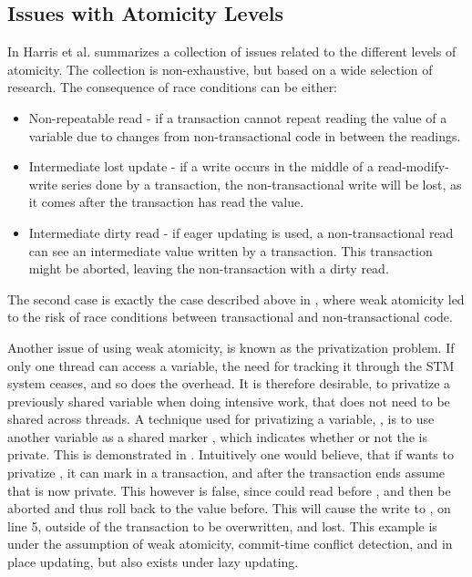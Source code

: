\subsection{Issues with Atomicity Levels}
In \cite[p. 30-35]{harris2010transactional} Harris et al. summarizes a collection of issues related to the different levels of atomicity. The collection is non-exhaustive, but based on a wide selection of research. The consequence of race conditions can be either:
\begin{itemize}
	\item Non-repeatable read - if a transaction cannot repeat reading the value of a variable due to changes from non-transactional code in between the readings.
	\item Intermediate lost update - if a write occurs in the middle of a read-modify-write series done by a transaction, the non-transactional write will be lost, as it comes after the transaction has read the value.
	\item Intermediate dirty read - if eager updating\cite[p. 53]{dpt907e14trending} is used, a non-transactional read can see an intermediate value written by a transaction. This transaction might be aborted, leaving the non-transaction with a dirty read.
\end{itemize}
The second case is exactly the case described above in , where weak atomicity led to the risk of race conditions between transactional and non-transactional code. 

Another issue of using weak atomicity, is known as the privatization problem. If only one thread can access a variable, the need for tracking it through the \ac{STM} system ceases, and so does the overhead. It is therefore desirable, to privatize a previously shared variable when doing intensive work, that does not need to be shared across threads. A technique used for privatizing a variable, , is to use another variable as a shared marker , which indicates whether or not the  is private. This is demonstrated in . Intuitively one would believe, that if  wants to privatize , it can mark  in a transaction, and after the transaction ends assume that  is now private. This however is false, since  could read  before , and then be aborted and thus roll  back to the value before. This will cause the write to , on line 5, outside of the transaction to be overwritten, and lost. This example is under the assumption of weak atomicity, commit-time conflict detection, and in place updating, but also exists under lazy updating\cite[p. 34]{harris2010transactional}. 

